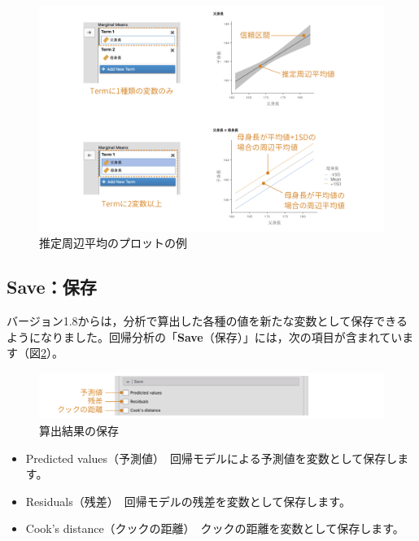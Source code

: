 \documentclass[
  12pt,
  a5jpaper,
  lualatex, ja=standard]{bxjsbook}
\providecommand{\tightlist}{%
  \setlength{\itemsep}{0pt}\setlength{\parskip}{0pt}}
\newenvironment{jmvsettings}{%
	\begin{center}%
	\begin{tcolorbox}[%
		title=設定項目,
		colframe=gmoji,
		colbacktitle=gmoji,
		colback=gmoji!2!white,
		breakable,
		width=.9\textwidth,
		]\small\addtolength{\leftmargini}{-3\labelsep}%
	}%
	{\end{tcolorbox}\end{center}}
\begin{document}
\begin{figure}[!ht]

{\centering \includegraphics[width=1\linewidth]{images/regression/lr-emm-plots} 

}

\caption{推定周辺平均のプロットの例}\label{fig:regression-lr-emm-plots}
\end{figure}

\hypertarget{sub:regression-LR-save}{%
\subsection{Save：保存}\label{sub:regression-LR-save}}

バージョン1.8からは，分析で算出した各種の値を新たな変数として保存できるようになりました。回帰分析の「\textbf{Save}（保存）」には，次の項目が含まれています（図\ref{fig:regression-lr-save}）。

\begin{figure}[!ht]

{\centering \includegraphics[width=1\linewidth]{images/regression/lr-save} 

}

\caption{算出結果の保存}\label{fig:regression-lr-save}
\end{figure}

\begin{jmvsettings}

\begin{itemize}
\tightlist
\item
  Predicted values（予測値）　回帰モデルによる予測値を変数として保存します。
\item
  Residuals（残差）　回帰モデルの残差を変数として保存します。
\item
  Cook's distance（クックの距離）　クックの距離を変数として保存します。
\end{itemize}

\end{jmvsettings}
\end{document}
